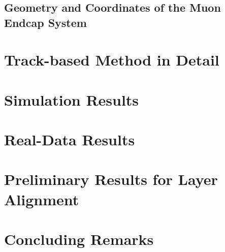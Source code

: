 \documentclass[12pt]{article}
\begin{document}
\subsection{Geometry and Coordinates of the Muon Endcap System}





\section{Track-based Method in Detail}
\label{sec:details}

\section{Simulation Results}

\section{Real-Data Results}

\section{Preliminary Results for Layer Alignment}

\section{Concluding Remarks}
\end{document}
